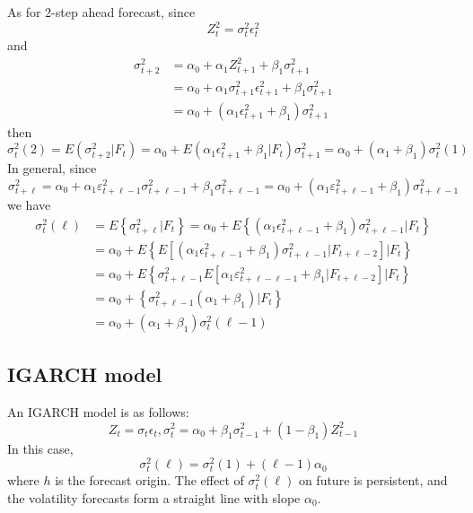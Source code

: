 \documentclass{article}
\begin{document}
\noindent As for 2-step ahead forecast, since
\begin{equation*}
Z_{t}^{2}=\sigma_{t}^{2} \epsilon_{t}^{2}
\end{equation*}
and
\begin{equation*}
\begin{aligned} \sigma_{t+2}^{2} &=\alpha_{0}+\alpha_{1} Z_{t+1}^{2}+\beta_{1} \sigma_{t+1}^{2} \\ &=\alpha_{0}+\alpha_{1} \sigma_{t+1}^{2} \epsilon_{t+1}^{2}+\beta_{1} \sigma_{t+1}^{2} \\ &=\alpha_{0}+\left(\alpha_{1} \epsilon_{t+1}^{2}+\beta_{1}\right) \sigma_{t+1}^{2} \end{aligned}
\end{equation*}
then
\begin{equation*}
\sigma_{t}^{2}(2)=E\left(\sigma_{t+2}^{2} | F_{t}\right)=\alpha_{0}+E\left(\alpha_{1} \epsilon_{t+1}^{2}+\beta_{1} | F_{t}\right) \sigma_{t+1}^{2}=\alpha_{0}+\left(\alpha_{1}+\beta_{1}\right) \sigma_{t}^{2}(1)
\end{equation*}
In general, since
\begin{equation*}
\sigma_{t+\ell}^{2}=\alpha_{0}+\alpha_{1} \varepsilon_{t+\ell-1}^{2} \sigma_{t+\ell-1}^{2}+\beta_{1} \sigma_{t+\ell-1}^{2}=\alpha_{0}+\left(\alpha_{1} \varepsilon_{t+\ell-1}^{2}+\beta_{1}\right) \sigma_{t+\ell-1}^{2}
\end{equation*}
we have
\begin{equation*}
\begin{aligned} \sigma_{t}^{2}(\ell) &=E\left\{\sigma_{t+\ell}^{2} | F_{t}\right\}=\alpha_{0}+E\left\{\left(\alpha_{1} \epsilon_{t+\ell-1}^{2}+\beta_{1}\right) \sigma_{t+\ell-1}^{2} | F_{t}\right\} \\ &=\alpha_{0}+E\left\{E\left[\left(\alpha_{1} \epsilon_{t+\ell-1}^{2}+\beta_{1}\right) \sigma_{t+\ell-1}^{2} | F_{t+\ell-2}\right] | F_{t}\right\}\\
&=\alpha_{0}+E\left\{\sigma_{t+\ell-1}^{2} E\left[\alpha_{1} \varepsilon_{t+\ell-\ell-1}^{2}+\beta_{1} | F_{t+\ell-2}\right] | F_{t}\right\} \\
&=\alpha_{0}+\left\{\sigma_{t+\ell-1}^{2}\left(\alpha_{1}+\beta_{1}\right) | F_{t}\right\} \\ &=\alpha_{0}+\left(\alpha_{1}+\beta_{1}\right) \sigma_{t}^{2}(\ell-1)
\end{aligned}
\end{equation*}

\subsection{IGARCH model}
An IGARCH model is as follows:
\begin{equation*}
Z_{t}=\sigma_{t} \epsilon_{t}, \sigma_{t}^{2}=\alpha_{0}+\beta_{1} \sigma_{t-1}^{2}+\left(1-\beta_{1}\right) Z_{t-1}^{2}
\end{equation*}
In this case,
\begin{equation*}
\sigma_{t}^{2}(\ell)=\sigma_{t}^{2}(1)+(\ell-1) \alpha_{0}
\end{equation*}
where $h$ is the forecast origin. The effect of $\sigma_{t}^{2}(\ell)$ on future is persistent, and the volatility forecasts form a straight line with slope $\alpha_{0}$.
\end{document}
